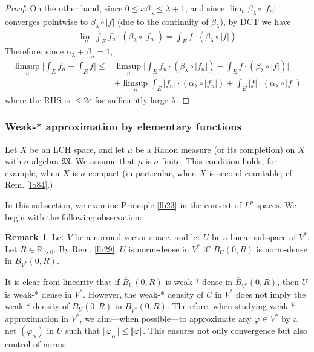 \documentclass[12pt,b5paper,notitlepage]{article}
\theoremstyle{definition}
\newtheorem{rem}[df]{Remark}
\theoremstyle{plain}
\newcommand{\fk}{\mathfrak}
\newcommand{\ovl}{\overline}
\newcommand{\Rbb}{\mathbb R}
\newcommand{\eps}{\varepsilon}
\newcommand{\hqed}{\hfill\qedsymbol}
\numberwithin{equation}{section}
\begin{document}
\begin{proof}
On the other hand, since $0\leq x\beta_\lambda\leq \lambda+1$, and since $\lim_n \beta_\lambda\circ|f_n|$ converges pointwise to $\beta_\lambda\circ|f|$ (due to the continuity of $\beta_\lambda$), by DCT we have
\begin{align*}
\lim_n \int_E f_n\cdot(\beta_\lambda\circ|f_n|)=\int_E f\cdot(\beta_\lambda\circ|f|)
\end{align*}
Therefore, since $\alpha_\lambda+\beta_\lambda=1$,
\begin{align*}
\limsup_n \Big|\int_Ef_n-\int_E f\Big|\leq& \limsup_n \Big|\int_E f_n\cdot(\beta_\lambda\circ|f_n|)-\int_E f\cdot(\beta_\lambda\circ|f|)  \Big|\\
&+\limsup_n\int_E |f_n|\cdot(\alpha_\lambda\circ|f_n|)+\int_E |f|\cdot(\alpha_\lambda\circ|f|)
\end{align*}
where the RHS is $\leq 2\eps$ for sufficiently large $\lambda$.
\end{proof}



\subsubsection{Weak-* approximation by elementary functions}

Let $X$ be an LCH space, and let $\mu$ be a Radon measure (or its completion) on $X$ with $\sigma$-algebra $\fk M$. We assume that $\mu$ is $\sigma$-finite. This condition holds, for example, when $X$ is $\sigma$-compact (in particular, when $X$ is second countable; cf. Rem. \ref{lb84}.)


In this subsection, we examine Principle \ref{lb23} in the context of $L^p$-spaces. We begin with the following observation:

\begin{rem}
Let $V$ be a normed vector space, and let $U$ be a linear subspace of $V^*$. Let $R\in\Rbb_{>0}$. By Rem. \ref{lb29}, $U$ is norm-dense in $V^*$ iff $\ovl B_U(0,R)$ is norm-dense in $\ovl B_{V^*}(0,R)$. 

It is clear from linearity that if $\ovl B_U(0,R)$ is weak-* dense in $\ovl B_{V^*}(0,R)$, then $U$ is weak-* dense in $V^*$. However, the weak-* density of $U$ in $V^*$ does not imply the weak-* density of $\ovl B_U(0,R)$ in $\ovl B_{V^*}(0,R)$. Therefore, when studying weak-* approximation in $V^*$, we aim---when possible---to approximate any $\varphi\in V^*$ by a net $(\varphi_\alpha)$ in $U$ such that $\Vert \varphi_\alpha\Vert\leq\Vert\varphi\Vert$. This ensures not only convergence but also control of norms.  \hqed
\end{rem}
\end{document}
